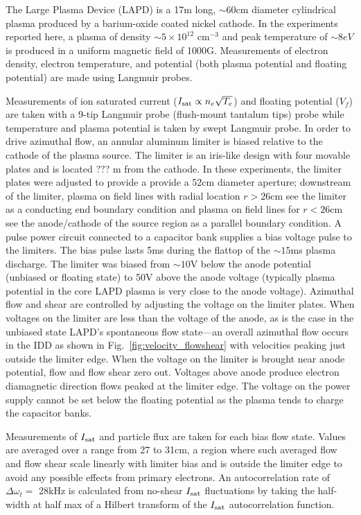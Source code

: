 \documentclass[aps,prl,amsmath,amssymb,preprint,superscriptaddress]{revtex4}
\begin{document}
The Large Plasma Device \cite{gek91} (LAPD) is a 17m long, $\sim 60$cm
diameter cylindrical plasma produced by a barium-oxide coated nickel
cathode. In the experiments reported here, a plasma of density $\sim 5
\times 10^{12}$ cm$^{-3}$ and peak temperature of $\sim 8 eV$ is
produced in a uniform magnetic field of 1000G.  Measurements of 
electron density, electron temperature, and potential (both plasma
potential and floating potential) are made using Langmuir probes.  

Measurements of ion
saturated current ($I_{\rm sat} \propto n_e \sqrt{T_e}$) and floating
potential ($V_f$) are taken with a 9-tip Langmuir probe (flush-mount
tantalum tips) probe while
temperature and plasma potential is taken by swept Langmuir probe. In order to drive azimuthal flow, an annular aluminum limiter is biased relative to the cathode of the plasma source.  The limiter is an iris-like design with four movable plates and is located ??? m from the cathode.  In these experiments, the limiter plates were adjusted to provide a provide a 52cm diameter aperture; downstream of the limiter, plasma on field lines with radial location $r>26$cm see the limiter as a conducting end boundary condition and plasma on field lines for $r<26$cm see the anode/cathode of the source region as a parallel boundary condition.  A pulse power circuit connected to a capacitor bank supplies a bias voltage pulse to the limiters.  The bias pulse lasts 5ms during the flattop of the $\sim 15$ms plasma discharge. The limiter was biased from $\sim 10$V below the anode potential (unbiased or floating state) to 50V above the anode voltage (typically plasma potential in the core LAPD plasma is very close to the anode voltage).  
Azimuthal flow and shear are controlled by adjusting the voltage on the limiter plates. When voltages on the limiter are less than the voltage of the anode, as is the case in the unbiased state LAPD's spontaneous flow state---an overall azimuthal flow occurs in the IDD as shown in Fig.~\ref{fig:velocity_flowshear} with velocities peaking just outside the limiter edge. When the voltage on the limiter is brought near anode potential, flow and flow shear zero out. Voltages above anode produce electron diamagnetic direction flows peaked at the limiter edge. The voltage on the power supply cannot be set below the floating potential as the plasma tends to charge the capacitor banks.

Measurements of $I_{\rm sat}$ and particle flux are taken for each bias flow state. Values are averaged over a range from 27 to 31cm, a region where such averaged flow and flow shear scale linearly with limiter bias and is outside the limiter edge to avoid any possible effects from primary electrons. An autocorrelation rate of $\Delta \omega_{t} = $ 28kHz is calculated from no-shear $I_{\rm sat}$ fluctuations by taking the half-width at half max of a Hilbert transform of the $I_{\rm sat}$ autocorrelation function.
\end{document}

